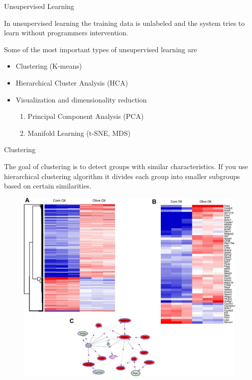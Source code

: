 \documentclass[11pt, aspectratio=43]{beamer}
\begin{document}
\begin{frame}{Unsupervised Learning}	

	In unsupervised learning the training data is unlabeled and the system tries to learn without programmers intervention.
	
	Some of the most important types of unsupervised learning are
	\begin{itemize}
		\item Clustering (K-means)
		\item	Hierarchical Cluster Analysis (HCA)
		\item Visualization and dimensionality reduction
		\begin{enumerate}
			\item 	Principal Component Analysis (PCA)
			\item  Manifold Learning (t-SNE, MDS)
		\end{enumerate}

	\end{itemize}

\end{frame}



\begin{frame}{Clustering}

	The goal of clustering is to detect groups with similar characteristics. If you use hierarchical clustering algorithm it divides each group into smaller subgroups based on certain similarities.
	\begin{figure}[h]
	\centering
	\includegraphics[scale=0.35]{Figures/clustering.jpg}
\end{figure}			
	

\end{frame}
\end{document}
